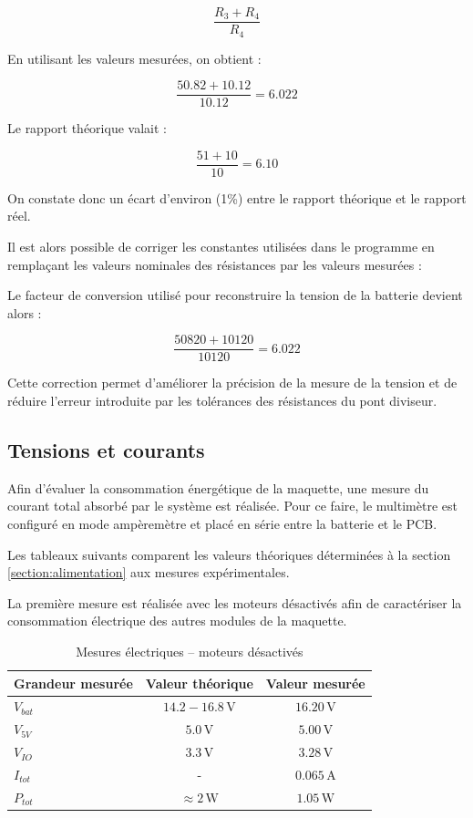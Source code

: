 $$
\frac{R_3+R_4}{R_4}
$$

En utilisant les valeurs mesurées, on obtient :

$$
\frac{50.82 + 10.12}{10.12}=6.022
$$

Le rapport théorique valait :

$$
\frac{51+10}{10}=6.10
$$

On constate donc un écart d'environ (1\%) entre le rapport théorique et le rapport réel.

Il est alors possible de corriger les constantes utilisées dans le programme en remplaçant les valeurs nominales des résistances par les valeurs mesurées :


Le facteur de conversion utilisé pour reconstruire la tension de la batterie devient alors :

$$
\frac{50820+10120}{10120}=6.022
$$

Cette correction permet d'améliorer la précision de la mesure de la tension et de réduire l'erreur introduite par les tolérances des résistances du pont diviseur.

\subsection{Tensions et courants}

Afin d'évaluer la consommation énergétique de la maquette, une mesure du courant total absorbé par le système est réalisée. Pour ce faire, le multimètre est configuré en mode ampèremètre et placé en série entre la batterie et le PCB.

Les tableaux suivants comparent les valeurs théoriques déterminées à la section \ref{section:alimentation} aux mesures expérimentales.

La première mesure est réalisée avec les moteurs désactivés afin de caractériser la consommation électrique des autres modules de la maquette.

\begin{table}[H]
    \centering
    \begin{tabular}{|l|c|c|}
        \hline
        \textbf{Grandeur mesurée} & \textbf{Valeur théorique} & \textbf{Valeur mesurée} \\
        \hline
        $V_{bat}$ & $14.2-16.8\,\si{\volt}$ & $16.20\,\si{\volt}$ \\
        \hline
        $V_{5V}$ & $5.0\,\si{\volt}$ & $5.00\,\si{\volt}$ \\
        \hline
        $V_{IO}$ & $3.3\,\si{\volt}$ & $3.28\,\si{\volt}$ \\
        \hline
        $I_{tot}$ & - & $0.065\,\si{\ampere}$ \\
        \hline
        $P_{tot}$ & $\approx 2\,\si{\watt}$ & $1.05\,\si{\watt}$ \\
        \hline
    \end{tabular}
    \caption{Mesures électriques -- moteurs désactivés}
    \label{tab:moteurs_eteints}
\end{table}

